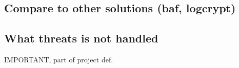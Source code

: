 
\subsection{Compare to other solutions (baf, logcrypt)}

\subsection{What threats is not handled}
IMPORTANT, part of project def.
